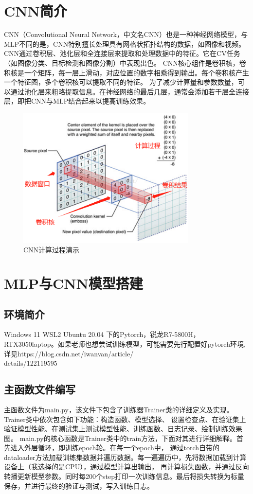 \documentclass[UTF8]{ctexart}
\begin{document}
\section{CNN简介}
CNN（Convolutional Neural Network，中文名CNN）也是一种神经网络模型，与MLP不同的是，CNN特别擅长处理具有网格状拓扑结构的数据，如图像和视频。
CNN通过卷积层、池化层和全连接层来提取和处理数据中的特征。它在CV任务（如图像分类、目标检测和图像分割）中表现出色。
CNN核心组件是卷积核，卷积核是一个矩阵，每一层上滑动，对应位置的数字相乘得到输出。每个卷积核产生一个特征图，多个卷积核可以提取不同的特征。
为了减少计算量和参数数量，可以通过池化层来粗略提取信息。在神经网络的最后几层，通常会添加若干层全连接层，即把CNN与MLP结合起来以提高训练效果。
\begin{figure}[h]
    \centering
    \includegraphics[width=0.8\textwidth]{CNN.png}
    \caption*{CNN计算过程演示}
\end{figure}


\section{MLP与CNN模型搭建}

\subsection{环境简介}
Windows 11 WSL2 Ubuntu 20.04 下的Pytorch，锐龙R7-5800H，RTX3050laptop。如果老师也想尝试训练模型，可能需要先行配置好pytorch环境,
详见https://blog.csdn.net/iwanvan/article/\\details/122119595

\subsection{主函数文件编写}
主函数文件为main.py，该文件下包含了训练器Trainer类的详细定义及实现。Trainer类中依次包含如下功能：构造函数、模型选择、
设置检查点、在验证集上验证模型性能、在测试集上测试模型性能、训练函数、日志记录、绘制训练效果图。
main.py的核心函数是Trainer类中的train方法，下面对其进行详细解释。首先进入外层循环，即训练epoch轮。在每一个epoch中，
通过torch自带的dataloader方法加载训练集数据并遍历数据。每一遍遍历中，先将数据加载到计算设备上（我选择的是CPU），通过模型计算出输出，
再计算损失函数，并通过反向转播更新模型参数。同时每200个step打印一次训练信息。最后将损失转换为标量保存，并进行最终的验证与测试，写入训练日志。
\end{document}
